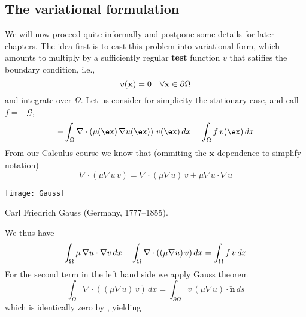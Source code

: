 \begin{kaobox}
\begin{itemize}
\end{itemize}
\end{kaobox}

\subsection{The variational formulation}

We will now proceed quite informally and postpone some details for later chapters.
The idea first is to cast this problem into
variational form, which amounts to multiply by a sufficiently regular
\textbf{test} function $v$ that satifies the boundary condition, i.e.,
\begin{equation}
v(\mathbf{x}) = 0~~~\forall \mathbf{x} \in \partial{\Omega} \labeq{vzeroG}
\end{equation}
and integrate over $\Omega$. 
Let us consider for simplicity the stationary case, and call $f = -\mathcal{G}$,
\begin{equation}
-\int_{\Omega}{\nabla\cdot \left ( \mu(\ex)\,\nabla{u}(\ex)\right ) \, {v}(\ex)}\,dx =
\int_{\Omega}{f\,v(\ex)}\,dx \labeq{poissonbasicfv}
\end{equation}
From our Calculus course we know that (ommiting the $\mathbf{x}$ dependence to simplify notation)
\begin{equation}
\nabla \cdot \left(  \mu \nabla{u} \, v  \right) = \nabla \cdot \left(  \mu \nabla{u}  \right)\, v
+ \mu \nabla{u} \cdot \nabla{u} \nonumber
\end{equation}
\begin{marginfigure}[-5.0cm]
       \texttt{[image: Gauss]}
       \caption[]{Carl Friedrich Gauss (Germany, 1777--1855).} 
\end{marginfigure}
We thus have
\begin{equation}
\int_{\Omega}{\mu\,\nabla{u}\cdot \nabla{v} }\,dx -\int_{\Omega}{\nabla \cdot \left(  (\mu \nabla{u}) \, v  \right)}\,dx  = 
\int_{\Omega}{f\,v}\,dx \labeq{poissonbasicfvfin}
\end{equation}
For the second term in the left hand side we apply Gauss theorem
\begin{equation}
\int_{\Omega}{\nabla \cdot \left(  (\mu \nabla{u}) \, v  \right)}\,dx  = \int_{\partial{\Omega}}{v\,(\mu \nabla{u})\cdot \check{\mathbf{n}}}\,ds
\end{equation}
which is identically zero by , yielding
